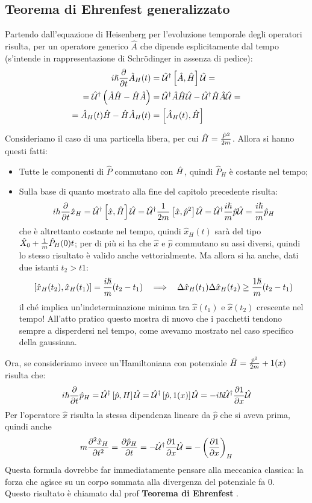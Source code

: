 \subsection{Teorema di Ehrenfest generalizzato}

Partendo dall'equazione di Heisenberg per l'evoluzione temporale degli operatori risulta, per un operatore generico $\hat A$ che dipende esplicitamente dal tempo (s'intende in rappresentazione di Schrödinger in assenza di pedice):
\begin{align*}
	i\hslash\frac{\partial }{\partial t}\hat A_H(t) &= \hat{\mathcal{U}}^\dag \left[\hat A, \hat{H}\right] \hat{\mathcal{U}} =\\
	= \hat{\mathcal{U}}^\dag \left( \hat A \hat{H} - \hat{H} \hat A \right) &= \hat{\mathcal{U}}^\dag \hat A \hat{H} \hat{\mathcal{U}} - \hat{\mathcal{U}}^\dag \hat{H} \hat A \hat{\mathcal{U}} =\\
	= \hat A_H(t) \hat{H} - \hat{H} \hat A_H(t) &= \left[\hat A_H(t), \hat{H}\right]
\end{align*}

Consideriamo il caso di una particella libera, per cui $\hat{H} = \frac{\hat P^2}{2m}$. Allora si hanno questi fatti:
\begin{itemize}
	\item Tutte le componenti di $\hat P$ commutano con $\hat{H}$, quindi $\hat P_H$ è costante nel tempo;
	\item Sulla base di quanto mostrato alla fine del capitolo precedente risulta:
	\[
		ih\frac{\partial }{\partial t}\hat x_H = \hat{\mathcal{U}}^\dag \left[\hat x, \hat{H}\right]\hat{\mathcal{U}} = \hat{\mathcal{U}}^\dag \frac{1}{2m} \left[\hat x, \hat p^2\right] \hat{\mathcal{U}} = \hat{\mathcal{U}}^\dag \frac{i\hslash}{m} \hat p \hat{\mathcal{U}} = \frac{i\hslash}{m} \hat p_H
	\]
	che è altrettanto costante nel tempo, quindi $\hat x_H(t)$ sarà del tipo $\hat X_0 + \frac{1}{m} \hat P_H(0) t$; per di più si ha che $\hat x$ e $\hat p$ commutano su assi diversi, quindi lo stesso risultato è valido anche vettorialmente. Ma allora si ha anche, dati due istanti $t_2 > t1$:
	\[
		\left[\hat x_H(t_2), \hat x_H(t_1)\right] = \frac{i\hslash}{m}(t_2 - t_1) \ \ \implies \ \ \Delta \hat x_H(t_1)\Delta \hat x_H(t_2) \geq \frac{1\hslash}{m}(t_2 - t_1)
	\]
	il ché implica un'indeterminazione minima tra $\hat x(t_1)$ e $\hat x(t_2)$ crescente nel tempo! All'atto pratico questo mostra di nuovo che i pacchetti tendono sempre a disperdersi nel tempo, come avevamo mostrato nel caso specifico della gaussiana.
\end{itemize}

Ora, se consideriamo invece un'Hamiltoniana con potenziale $\hat{H} = \frac{\hat p^2}{2m} + 1(x)$ risulta che:
\[
	i\hslash \frac{\partial }{\partial t}\hat p_H = \hat{\mathcal{U}}^\dag \left[\hat p, H\right] \hat{\mathcal{U}} = \hat{\mathcal{U}}^\dag \left[\hat p, 1(x)\right] \hat{\mathcal{U}} = -i\hslash \hat{\mathcal{U}}^\dag \frac{\partial 1 }{\partial x} \hat{\mathcal{U}}
\]
Per l'operatore $\hat x$ risulta la stessa dipendenza lineare da $\hat p$ che si aveva prima, quindi anche
\[
	m\frac{\partial^2 \hat x_H}{\partial t^2} = \frac{\partial \hat p_H}{\partial t} = - \hat{\mathcal{U}}^\dag \frac{\partial 1}{\partial x}\hat{\mathcal{U}} = - \left( \frac{\partial 1}{\partial x} \right)_H
\]
Questa formula dovrebbe far immediatamente pensare alla meccanica classica: la forza che agisce su un corpo sommata alla divergenza del potenziale fa 0. \\
Questo risultato è chiamato dal prof \textbf{Teorema di Ehrenfest} .
\tab

